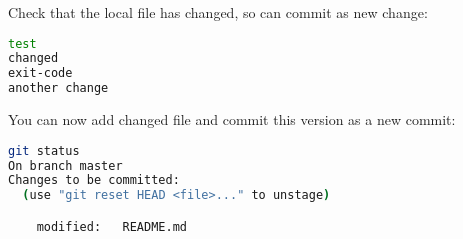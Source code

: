 \noindent Check that the local file has changed, so can commit as new change:

\begin{lstlisting}[language=Bash,caption={Changed file: README.md},style=default]
test
changed
exit-code
another change
\end{lstlisting}

\noindent You can now add changed file and commit this version as a new commit:

\begin{lstlisting}[language=Bash,style=default]
git status
On branch master
Changes to be committed:
  (use "git reset HEAD <file>..." to unstage)

	modified:   README.md
\end{lstlisting}

% 
